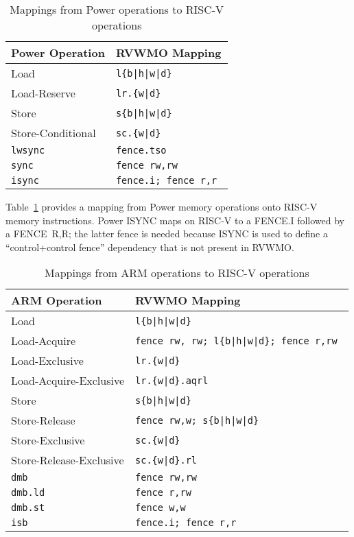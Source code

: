 \begin{table}[h!]
  \centering
  \begin{tabular}{|l|l|}
    \hline
    Power Operation & RVWMO Mapping \\
    \hline
    \hline
    Load              & \tt l\{b|h|w|d\}  \\
    \hline
    Load-Reserve      & \tt lr.\{w|d\}  \\
    \hline
    Store             & \tt s\{b|h|w|d\}  \\
    \hline
    Store-Conditional & \tt sc.\{w|d\}  \\
    \hline
    \tt lwsync        & \tt fence.tso \\
    \hline
    \tt sync          & \tt fence rw,rw \\
    \hline
    \tt isync         & \tt fence.i; fence r,r \\
    \hline
  \end{tabular}
  \caption{Mappings from Power operations to RISC-V operations}
  \label{tab:powermappings}
\end{table}

Table~\ref{tab:powermappings} provides a mapping from Power memory operations onto RISC-V memory instructions.
Power ISYNC maps on RISC-V to a FENCE.I followed by a FENCE~R,R; the latter fence is needed because ISYNC is used to define a ``control+control fence'' dependency that is not present in RVWMO.

\begin{table}[h!]
  \centering
  \begin{tabular}{|l|l|}
    \hline
    ARM Operation             & RVWMO Mapping \\
    \hline
    \hline
    Load                      & \tt l\{b|h|w|d\}  \\
    \hline
    Load-Acquire              & \tt fence rw, rw; l\{b|h|w|d\}; fence r,rw  \\
    \hline
    Load-Exclusive            & \tt lr.\{w|d\}  \\
    \hline
    Load-Acquire-Exclusive    & \tt lr.\{w|d\}.aqrl \\
    \hline
    Store                     & \tt s\{b|h|w|d\}  \\
    \hline
    Store-Release             & \tt fence rw,w; s\{b|h|w|d\}  \\
    \hline
    Store-Exclusive           & \tt sc.\{w|d\}  \\
    \hline
    Store-Release-Exclusive   & \tt sc.\{w|d\}.rl  \\
    \hline
    \tt dmb                   & \tt fence rw,rw \\
    \hline
    \tt dmb.ld                & \tt fence r,rw \\
    \hline
    \tt dmb.st                & \tt fence w,w \\
    \hline
    \tt isb                   & \tt fence.i; fence r,r \\
    \hline
  \end{tabular}
  \caption{Mappings from ARM operations to RISC-V operations}
  \label{tab:armmappings}
\end{table}

